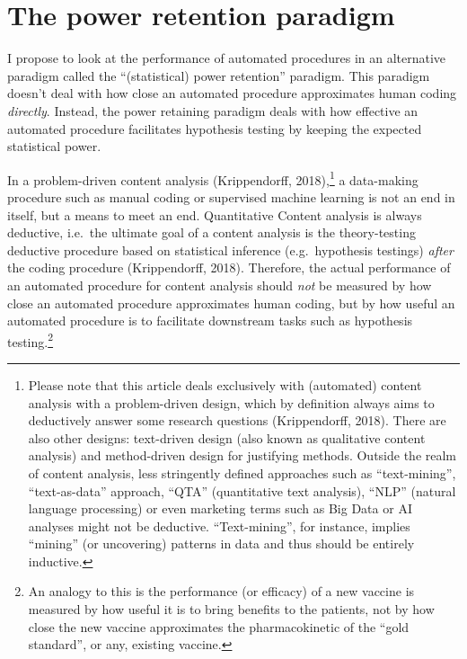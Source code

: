 \documentclass[english,man,floatsintext]{apa6}
\begin{document}
\hypertarget{the-power-retention-paradigm}{%
\section{The power retention paradigm}\label{the-power-retention-paradigm}}

I propose to look at the performance of automated procedures in an alternative paradigm called the \enquote{(statistical) power retention} paradigm. This paradigm doesn't deal with how close an automated procedure approximates human coding \emph{directly}. Instead, the power retaining paradigm deals with how effective an automated procedure facilitates hypothesis testing by keeping the expected statistical power.

In a problem-driven content analysis (Krippendorff, 2018),\footnote{Please note that this article deals exclusively with (automated) content analysis with a problem-driven design, which by definition always aims to deductively answer some research questions (Krippendorff, 2018). There are also other designs: text-driven design (also known as qualitative content analysis) and method-driven design for justifying methods. Outside the realm of content analysis, less stringently defined approaches such as \enquote{text-mining}, \enquote{text-as-data} approach, \enquote{QTA} (quantitative text analysis), \enquote{NLP} (natural language processing) or even marketing terms such as Big Data or AI analyses might not be deductive. \enquote{Text-mining}, for instance, implies \enquote{mining} (or uncovering) patterns in data and thus should be entirely inductive.} a data-making procedure such as manual coding or supervised machine learning is not an end in itself, but a means to meet an end. Quantitative Content analysis is always deductive, i.e.~the ultimate goal of a content analysis is the theory-testing deductive procedure based on statistical inference (e.g.~hypothesis testings) \emph{after} the coding procedure (Krippendorff, 2018). Therefore, the actual performance of an automated procedure for content analysis should \emph{not} be measured by how close an automated procedure approximates human coding, but by how useful an automated procedure is to facilitate downstream tasks such as hypothesis testing.\footnote{An analogy to this is the performance (or efficacy) of a new vaccine is measured by how useful it is to bring benefits to the patients, not by how close the new vaccine approximates the pharmacokinetic of the \enquote{gold standard}, or any, existing vaccine.}
\end{document}
